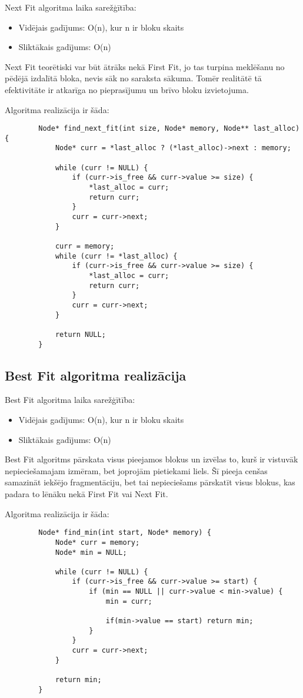 \documentclass{report}
\begin{document}
	Next Fit algoritma laika sarežģītība:
	\begin{itemize}
		\item Vidējais gadījums: O(n), kur n ir bloku skaits
		\item Sliktākais gadījums: O(n)
	\end{itemize}
	
	Next Fit teorētiski var būt ātrāks nekā First Fit, jo tas turpina meklēšanu no pēdējā izdalītā bloka, nevis sāk no saraksta sākuma. Tomēr realitātē tā efektivitāte ir atkarīga no pieprasījumu un brīvo bloku izvietojuma.
	
	Algoritma realizācija ir šāda:
	
	\begin{verbatim}
		Node* find_next_fit(int size, Node* memory, Node** last_alloc) {
			Node* curr = *last_alloc ? (*last_alloc)->next : memory;
			
			while (curr != NULL) {
				if (curr->is_free && curr->value >= size) {
					*last_alloc = curr;
					return curr;
				}
				curr = curr->next;
			}
			
			curr = memory;
			while (curr != *last_alloc) {
				if (curr->is_free && curr->value >= size) {
					*last_alloc = curr;
					return curr;
				}
				curr = curr->next;
			}
			
			return NULL; 
		}
	\end{verbatim}
	
	\subsection{Best Fit algoritma realizācija}
	
	Best Fit algoritma laika sarežģītība:
	\begin{itemize}
		\item Vidējais gadījums: O(n), kur n ir bloku skaits
		\item Sliktākais gadījums: O(n)
	\end{itemize}
	
	Best Fit algoritms pārskata visus pieejamos blokus un izvēlas to, kurš ir vistuvāk nepieciešamajam izmēram, bet joprojām pietiekami liels. Šī pieeja cenšas samazināt iekšējo fragmentāciju, bet tai nepieciešams pārskatīt visus blokus, kas padara to lēnāku nekā First Fit vai Next Fit.
	
	Algoritma realizācija ir šāda:
	
	\begin{verbatim}
		Node* find_min(int start, Node* memory) {
			Node* curr = memory;
			Node* min = NULL;
			
			while (curr != NULL) {
				if (curr->is_free && curr->value >= start) {
					if (min == NULL || curr->value < min->value) {
						min = curr;
						
						if(min->value == start) return min;
					}
				}
				curr = curr->next;
			}
			
			return min; 
		}
	\end{verbatim}
	
\end{document}
